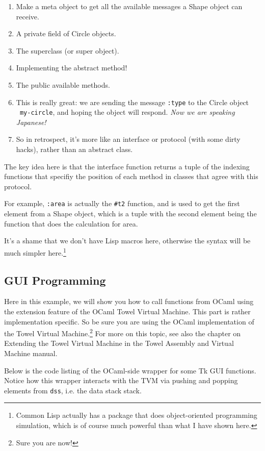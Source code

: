\documentclass{report}
\newcommand{\mtilde}[1]{\textasciitilde}
\begin{document}
\begin{enumerate}
\item Make a meta object to get all the available messages a Shape object can receive.
\item A private field of Circle objects.
\item The superclass (or super object).
\item Implementing the abstract method!
\item The public available methods.
\item This is really great: we are sending the message \texttt{:type} to the Circle object \texttt{\mtilde ~my-circle}, and hoping the object will respond. \textit{Now we are speaking Japanese!}
\item So in retrospect, it's more like an interface or protocol (with some dirty hacks), rather than an abstract class.
\end{enumerate}

The key idea here is that the interface function returns a tuple of the indexing functions that specifiy the position of each method in classes that agree with this protocol.

For example, \texttt{:area} is actually the \texttt{\#t2} function, and is used to get the first element from a Shape object, which is a tuple with the second element being the function that does the calculation for area.

It's a shame that we don't have Lisp macros here, otherwise the syntax will be much simpler here.\footnote{Common Lisp actually has a package that does object-oriented programming simulation, which is of course much powerful than what I have shown here.}

\subsection{GUI Programming}

Here in this example, we will show you how to call functions from OCaml using the extension feature of the OCaml Towel Virtual Machine. This part is rather implementation specific. So be sure you are using the OCaml implementation of the Towel Virtual Machine.\footnote{Sure you are now!} For more on this topic, see also the chapter on Extending the Towel Virtual Machine in the Towel Assembly and Virtual Machine manual.

Below is the code listing of the OCaml-side wrapper for some Tk GUI functions. Notice how this wrapper interacts with the TVM via pushing and popping elements from \texttt{dss}, i.e. the data stack stack.
\end{document}
